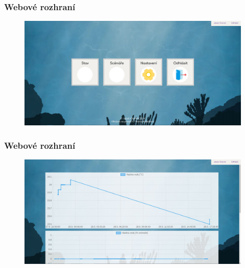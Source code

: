 \documentclass[%
  12pt,       				%
	t,                  %
	aspectratio=1610,   %
	unicode,						%
]{beamer}				    	%
\begin{document}
\begin{frame}[fragile]
	\frametitle{Webové rozhraní}
	\vspace{-1cm}
	\begin{figure}%
		\includegraphics[width=1.05\textwidth]{obrazky/prezentace/web/hlavni-menu.jpg}
	\end{figure}
\end{frame}

\begin{frame}[fragile]
	\frametitle{Webové rozhraní}
	\vspace{-1cm}
	\begin{figure}%
		\includegraphics[width=1.05\textwidth]{obrazky/prezentace/web/stav.jpg}
	\end{figure}
\end{frame}
\end{document}
